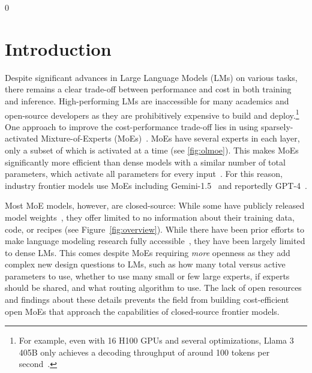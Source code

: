 \documentclass{article}
\begin{document}
\newpage
\begin{spacing}{0}
\tableofcontents
\end{spacing}
\newpage

\section{Introduction}
\label{sec:intro}

Despite significant advances in Large Language Models (LMs) on various tasks, there remains a clear trade-off between performance and cost in both training and inference. High-performing LMs are inaccessible for many academics and open-source developers as they are prohibitively expensive to build and deploy.\footnote{For example, even with 16 H100 GPUs and several optimizations, Llama 3 405B only achieves a decoding throughput of around 100 tokens per second~\citep{dubey2024llama3herdmodels}.} One approach to improve the cost-performance trade-off lies in using sparsely-activated Mixture-of-Experts (MoEs)~\citep{shazeer2017outrageously}. MoEs have several experts in each layer, only a subset of which is activated at a time (see \autoref{fig:olmoe}). This makes MoEs significantly more efficient than dense models with a similar number of total parameters, which activate all parameters for every input~\citep{yun2024inferenceoptimalmixtureofexpertlargelanguage}. For this reason, industry frontier models use MoEs including Gemini-1.5~\citep{geminiteam2024gemini} and reportedly GPT-4~\citep{gpt4moe}.

Most MoE models, however, are closed-source: While some have publicly released model weights~\citep{deepseekai2024deepseekv2,jiang2024mixtral,shen2024jetmoe,jambateam2024jamba15hybridtransformermambamodels,qwen_moe}, they offer limited to no information about their training data, code, or recipes (see Figure~\ref{fig:overview}). While there have been prior efforts to make language modeling research fully accessible~\citep{biderman2023pythiasuiteanalyzinglarge,groeneveld2024olmo,li2024datacomplm,liu2023llm360,workshop2023bloom,zhang2024mapneohighlycapabletransparent}, they have been largely limited to dense LMs. This comes despite MoEs requiring \textit{more} openness as they add complex new design questions to LMs, such as how many total versus active parameters to use, whether to use many small or few large experts, if experts should be shared, and what routing algorithm to use. The lack of open resources and findings about these details prevents the field from building cost-efficient open MoEs that approach the capabilities of closed-source frontier models.
\end{document}
